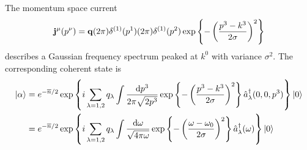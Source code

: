 \begin{example}
	The momentum space current
	\begin{equation*}
		\vb{j}^\mu(p^\nu)
		=
		\vb{q}
		(2\pi)\delta^{(1)}(p^1)
		(2\pi)\delta^{(1)}(p^2)
		\exp\left\{
			-
			\left(\frac{p^3-k^3}{2\sigma}\right)^2
		\right\}
	\end{equation*}
	describes a Gaussian frequency spectrum peaked at $k^0$ with variance $\sigma^2$.
	The corresponding coherent state is
	\begin{equation}
		\begin{split}
			\ket{\alpha}
			&=
			e^{-\overline{n}/2}
			\exp\left\{
				i
				\sum_{\lambda=1,2}
				q_\lambda
				\int\frac{\dd{p^3}}{2\pi\sqrt{2p^3}}
				\exp\left\{
					-
					\left(
						\frac{p^3-k^3}{2\sigma}
					\right)^2
				\right\}
				\hat{a}_\lambda^\dagger(0,0,p^3)
			\right\}
			\ket{0}
			\\
			&=
			e^{-\overline{n}/2}
			\exp\left\{
				i
				\sum_{\lambda=1,2}
				q_\lambda
				\int\frac{\dd{\omega}}{\sqrt{4\pi\omega}}
				\exp\left\{
					-
					\left(
						\frac{\omega-\omega_0}{2\sigma}
					\right)^2
				\right\}
				\hat{a}_\lambda^\dagger(\omega)
			\right\}
			\ket{0}
		\end{split}
	\end{equation}
\end{example}